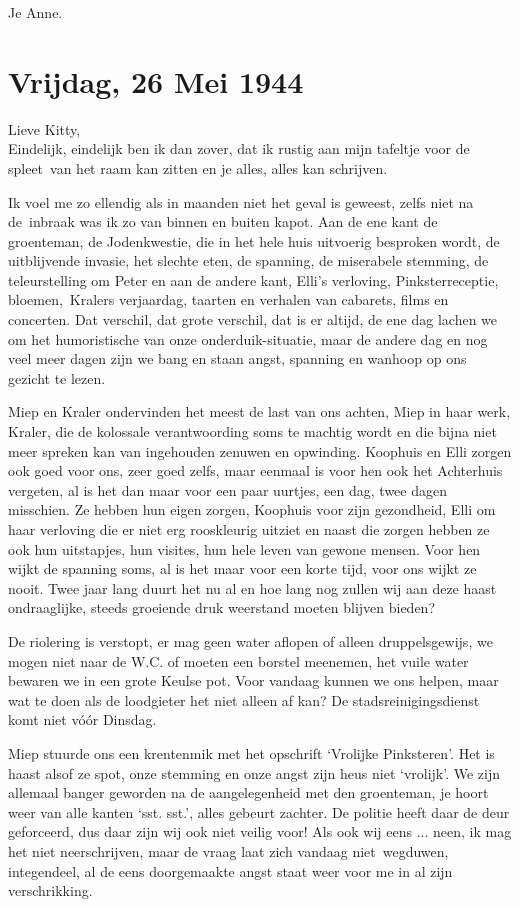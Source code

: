 \documentclass{book}
\begin{document}
Je Anne.

\section*{Vrijdag, 26 Mei 1944}

Lieve Kitty,\\
Eindelijk, eindelijk ben ik dan zover, dat ik rustig aan mijn
tafeltje voor de spleet~van het raam kan zitten en je alles, alles kan
schrijven.

Ik voel me zo ellendig als in maanden niet het geval is geweest, zelfs niet na
de~inbraak was ik zo van binnen en buiten kapot. Aan de ene kant de groenteman,
de Jodenkwestie, die in het hele huis uitvoerig besproken wordt, de uitblijvende
invasie, het slechte eten, de spanning, de miserabele stemming, de
teleurstelling om Peter en aan de andere kant, Elli's verloving,
Pinksterreceptie, bloemen,~Kralers verjaardag, taarten en verhalen van cabarets,
films en concerten. Dat verschil, dat grote verschil, dat is er altijd, de ene
dag lachen we om het humoristische van onze onderduik-situatie, maar de andere
dag en nog veel meer dagen zijn we bang en staan angst, spanning en wanhoop op
ons gezicht te lezen.

Miep en Kraler ondervinden het meest de last van ons achten, Miep in haar werk,
Kraler, die de kolossale verantwoording soms te machtig wordt en die bijna niet
meer spreken kan van ingehouden zenuwen en opwinding.  Koophuis en Elli zorgen
ook goed voor ons, zeer goed zelfs, maar eenmaal is voor hen ook het Achterhuis
vergeten, al is het dan maar voor een paar uurtjes, een dag, twee dagen
misschien. Ze hebben hun eigen zorgen, Koophuis voor zijn gezondheid, Elli om
haar verloving die er niet erg rooskleurig uitziet en naast die zorgen hebben ze
ook hun uitstapjes, hun visites, hun hele leven van gewone mensen. Voor hen
wijkt de spanning soms, al is het maar voor een korte tijd, voor ons wijkt ze
nooit. Twee jaar lang duurt het nu al en hoe lang nog zullen wij aan deze haast
ondraaglijke, steeds groeiende druk weerstand moeten blijven bieden?

De riolering is verstopt, er mag geen water aflopen of alleen druppelsgewijs, we
mogen niet naar de W.C. of moeten een borstel meenemen, het vuile water bewaren
we in een grote Keulse pot. Voor vandaag kunnen we ons helpen, maar wat te doen
als de loodgieter het niet alleen af kan? De stadsreinigingsdienst komt niet
vóór Dinsdag.

Miep stuurde ons een krentenmik met het opschrift `Vrolijke Pinksteren'.  Het is
haast alsof ze spot, onze stemming en onze angst zijn heus niet `vrolijk'. We
zijn allemaal banger geworden na de aangelegenheid met den groenteman, je hoort
weer van alle kanten `sst. sst.', alles gebeurt zachter. De politie heeft daar
de deur geforceerd, dus daar zijn wij ook niet veilig voor! Als ook wij eens ...
neen, ik mag het niet neerschrijven, maar de vraag laat zich vandaag
niet~wegduwen, integendeel, al de eens doorgemaakte angst staat weer voor me in
al zijn verschrikking.
\end{document}
